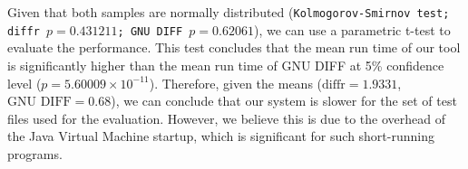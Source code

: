 Given that both samples are normally distributed (\texttt{Kolmogorov-Smirnov test; \texttt{diffr} $p=0.431211$; \texttt{GNU DIFF} $p=0.62061$}), we can use a parametric t-test to evaluate the performance.
This test concludes that the mean run time of our tool is significantly higher than the mean run time of GNU DIFF at 5\% confidence level ($p=5.60009\times 10^{-11}$).
Therefore, given the means ($\mbox{diffr} = 1.9331$, $\mbox{GNU DIFF}=0.68$), we can conclude that our system is slower for the set of test files used for the evaluation.
However, we believe this is due to the overhead of the Java Virtual Machine startup, which is significant for such short-running programs.

